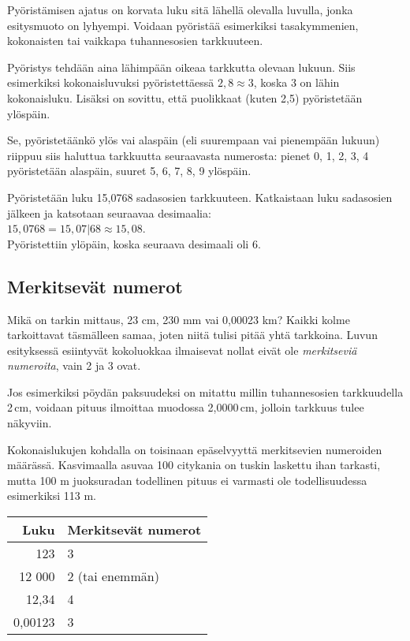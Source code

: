 Pyöristämisen ajatus on korvata luku sitä lähellä olevalla luvulla, jonka esitysmuoto on lyhyempi. Voidaan pyöristää
esimerkiksi tasakymmenien, kokonaisten tai vaikkapa tuhannesosien
tarkkuuteen.

Pyöristys tehdään aina lähimpään oikeaa tarkkutta olevaan lukuun. Siis esimerkiksi kokonaisluvuksi pyöristettäessä $2,8 \approx 3$, koska 3 on lähin kokonaisluku. Lisäksi on sovittu, että
puolikkaat (kuten 2,5) pyöristetään ylöspäin.

Se, pyöristetäänkö ylös vai alaspäin (eli suurempaan vai
pienempään lukuun) riippuu siis haluttua tarkkuutta
seuraavasta numerosta: pienet
0, 1, 2, 3, 4 pyöristetään alaspäin, suuret 5, 6, 7, 8, 9 ylöspäin.

\begin{esimerkki}
Pyöristetään luku 15,0768 sadasosien tarkkuuteen. Katkaistaan
luku sadasosien jälkeen ja katsotaan seuraavaa desimaalia:\\
$15,0768 = 15,07|68 \approx 15,08$.\\
Pyöristettiin ylöpäin, koska seuraava desimaali oli 6.
\end{esimerkki}


\subsection*{Merkitsevät numerot}

Mikä on tarkin mittaus, 23 cm, 230 mm vai 0,00023 km? Kaikki kolme tarkoittavat täsmälleen samaa, joten niitä tulisi pitää
yhtä tarkkoina. Luvun esityksessä esiintyvät kokoluokkaa ilmaisevat nollat eivät ole \emph{merkitseviä numeroita}, vain
2 ja 3 ovat.


Jos esimerkiksi pöydän paksuudeksi on mitattu millin tuhannesosien
tarkkuudella 2\,cm, voidaan pituus ilmoittaa muodossa 2,0000\,cm, jolloin tarkkuus tulee näkyviin. 

Kokonaislukujen kohdalla on toisinaan epäselvyyttä merkitsevien numeroiden määrässä. Kasvimaalla asuvaa 100 citykania on tuskin laskettu ihan tarkasti,
mutta 100 m juoksuradan todellinen pituus ei varmasti ole todellisuudessa
esimerkiksi 113 m.

\begin{center}
\begin{tabular}{r|l}
Luku & Merkitsevät numerot \\
\hline
123 & 3 \\
12 000 & 2 (tai enemmän)\\
12,34 & 4 \\
0,00123 & 3
\end{tabular}
\end{center}

